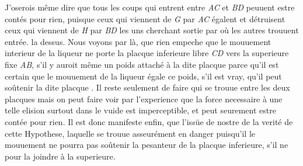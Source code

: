 
\pstart  J'oserois m\^{e}me dire que  tous les coups qui entrent entre \textit{AC} et \textit{BD} peuuent estre cont\'{e}s pour rien, puisque ceux qui viennent de \textit{G} par \textit{AC} \'{e}galent et d\'{e}truisent  ceux qui viennent de \textit{H} par \textit{BD} les uns cherchant  sortie par o\`{u} les autres trouuent  entr\'{e}e.  la dessus. Nous voyons par l\`{a}, que rien empeche que le mouuement interieur de la liqueur ne porte la placque inferieure libre \textit{CD} vers la superieure fixe \textit{AB}, s'il y auroit m\^{e}me un poids\protect{} attach\'{e} \`{a} la dite placque parce qu'il est certain que le mouuement de la liqueur \'{e}gale ce poids\protect{}, s'il est vray, qu'il peut so\^{u}tenir la dite placque . Il reste seulement de faire  qui se trouue entre les deux placques\protect{} mais on peut faire voir par l'experience que la force necessaire \`{a} une telle elision surtout dans le vuide\protect{}  est imperceptible, et peut seurement estre cont\'{e}e pour rien. Il est donc manifeste enfin, que l'iss\"{u}e de nostre  de la verit\'{e} de cette Hypothese, laquelle se trouue asseur\'{e}ment en danger puisqu'il  le mouuement  ne pourra pas so\^{u}tenir la pesanteur de la placque inferieure, s'il ne  pour la joindre \`{a} la superieure.
\pend